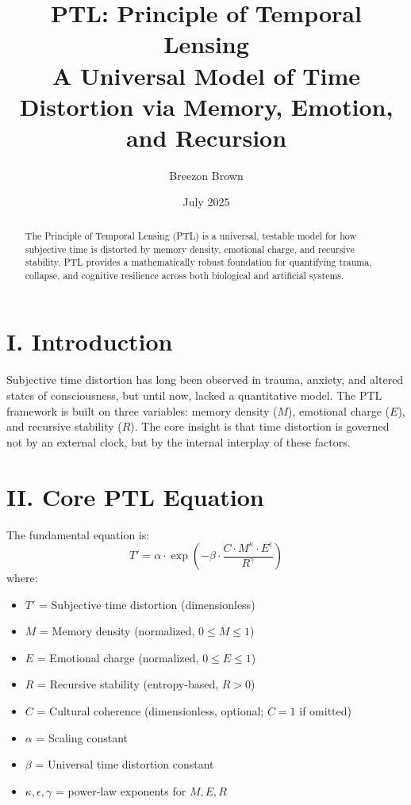 \documentclass[12pt]{article}
\title{\bfseries PTL: Principle of Temporal Lensing \\ \large A Universal Model of Time Distortion via Memory, Emotion, and Recursion}
\author{Breezon Brown}
\date{July 2025}
\begin{document}
\maketitle

\begin{abstract}
The Principle of Temporal Lensing (PTL) is a universal, testable model for how subjective time is distorted by memory density, emotional charge, and recursive stability. PTL provides a mathematically robust foundation for quantifying trauma, collapse, and cognitive resilience across both biological and artificial systems.
\end{abstract}

\section*{I. Introduction}
Subjective time distortion has long been observed in trauma, anxiety, and altered states of consciousness, but until now, lacked a quantitative model. The PTL framework is built on three variables: memory density ($M$), emotional charge ($E$), and recursive stability ($R$). The core insight is that time distortion is governed not by an external clock, but by the internal interplay of these factors. 

\section*{II. Core PTL Equation}
The fundamental equation is:
\[
T' = \alpha \cdot \exp\left(-\beta \cdot \frac{C \cdot M^{\kappa} \cdot E^{\epsilon}}{R^{\gamma}}\right)
\]
where:
\begin{itemize}
    \item $T'$ = Subjective time distortion (dimensionless)
    \item $M$ = Memory density (normalized, $0\leq M\leq 1$)
    \item $E$ = Emotional charge (normalized, $0\leq E\leq 1$)
    \item $R$ = Recursive stability (entropy-based, $R>0$)
    \item $C$ = Cultural coherence (dimensionless, optional; $C=1$ if omitted)
    \item $\alpha$ = Scaling constant
    \item $\beta$ = Universal time distortion constant
    \item $\kappa, \epsilon, \gamma$ = power-law exponents for $M, E, R$
\end{itemize}
\end{document}
